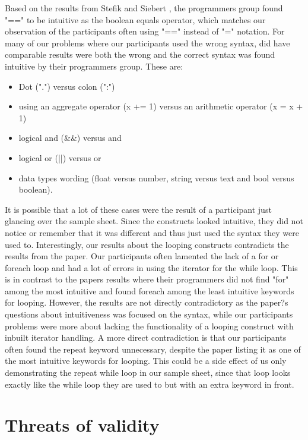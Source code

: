 Based on the results from Stefik and Siebert \cite{Empiricalinvestigation}, the programmers group found "==" to be intuitive as the boolean equals operator, which matches our observation of the participants often using "==" instead of "=" notation. For many of our problems where our participants used the wrong syntax, \cite{Empiricalinvestigation} did have comparable results were both the wrong and the correct syntax was found intuitive by their programmers group. These are: 
\begin{itemize}
\item Dot (".") versus colon (":")
\item using an aggregate operator (x += 1) versus an arithmetic operator (x = x + 1)
\item logical and (\&\&) versus and
\item logical or (||) versus or 
\item data types wording (float versus number, string versus text and bool versus boolean). 
\end{itemize}

It is possible that a lot of these cases were the result of a participant just glancing over the sample sheet. Since the constructs looked intuitive, they did not notice or remember that it was different and thus just used the syntax they were used to. Interestingly, our results about the looping constructs contradicts the results from the paper. Our participants often lamented the lack of a for or foreach loop and had a lot of errors in using the iterator for the while loop. This is in contrast to the papers results where their programmers did not find "for" among the most intuitive and found foreach among the least intuitive keywords for looping. However, the results are not directly contradictory as the paper?s questions about intuitiveness was focused on the syntax, while our participants problems were more about lacking the functionality of a looping construct with inbuilt iterator handling. A more direct contradiction is that our participants often found the repeat keyword unnecessary, despite the paper listing it as one of the most intuitive keywords for looping. This could be a side effect of us only demonstrating the repeat while loop in our sample sheet, since that loop looks exactly like the while loop they are used to but with an extra keyword in front. 


 





\section{Threats of validity}